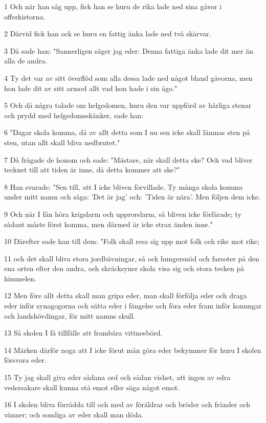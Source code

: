 \par 1 Och när han såg upp, fick han se huru de rika lade ned sina gåvor i offerkistorna.
\par 2 Därvid fick han ock se huru en fattig änka lade ned två skärvar.
\par 3 Då sade han: "Sannerligen säger jag eder: Denna fattiga änka lade dit mer än alla de andra.
\par 4 Ty det var av sitt överflöd som alla dessa lade ned något bland gåvorna, men hon lade dit av sitt armod allt vad hon hade i sin ägo."
\par 5 Och då några talade om helgedomen, huru den var uppförd av härliga stenar och prydd med helgedomsskänker, sade han:
\par 6 "Dagar skola komma, då av allt detta som I nu sen icke skall lämnas sten på sten, utan allt skall bliva nedbrutet."
\par 7 Då frågade de honom och sade: "Mästare, när skall detta ske? Och vad bliver tecknet till att tiden är inne, då detta kommer att ske?"
\par 8 Han svarade: "Sen till, att I icke bliven förvillade. Ty många skola komma under mitt namn och säga: 'Det är jag' och: 'Tiden är nära'. Men följen dem icke.
\par 9 Och när I fån höra krigslarm och upprorslarm, så bliven icke förfärade; ty sådant måste först komma, men därmed är icke strax änden inne."
\par 10 Därefter sade han till dem: "Folk skall resa sig upp mot folk och rike mot rike;
\par 11 och det skall bliva stora jordbävningar, så ock hungersnöd och farsoter på den ena orten efter den andra, och skräcksyner skola visa sig och stora tecken på himmelen.
\par 12 Men före allt detta skall man gripa eder, man skall förfölja eder och draga eder inför synagogorna och sätta eder i fängelse och föra eder fram inför konungar och landshövdingar, för mitt namns skull.
\par 13 Så skolen I få tillfälle att frambära vittnesbörd.
\par 14 Märken därför noga att I icke förut mån göra eder bekymmer för huru I skolen försvara eder.
\par 15 Ty jag skall giva eder sådana ord och sådan vishet, att ingen av edra vedersakare skall kunna stå emot eller säga något emot.
\par 16 I skolen bliva förrådda till och med av föräldrar och bröder och fränder och vänner; och somliga av eder skall man döda.

